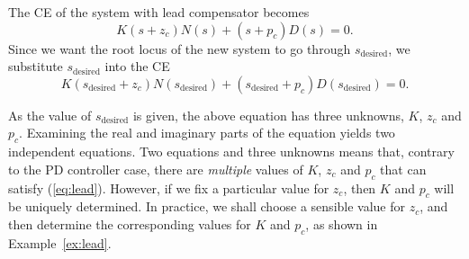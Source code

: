 \documentclass[a4paper,11pt]{report}
\theoremstyle{definition}
\newcommand{\des}{\textrm{desired}}
\begin{document}
The CE of the system with lead compensator becomes
\[
K(s+z_c)N(s) + (s+p_c)D(s)=0.
\]
Since we want the root locus of the new system to go through $s_\des$,
we substitute $s_\des$ into the CE
\begin{equation}
  \label{eq:lead}
  K(s_\des+z_c)N(s_\des)+(s_\des+p_c)D(s_\des) = 0.  
\end{equation}

As the value of $s_\des$ is given, the above equation has three
unknowns, $K$, $z_c$ and $p_c$. Examining the real and imaginary parts
of the equation yields two independent equations. Two equations and
three unknowns means that, contrary to the PD controller case, there
are \emph{multiple} values of $K$, $z_c$ and $p_c$ that can satisfy
(\ref{eq:lead}). However, if we fix a particular value for $z_c$, then
$K$ and $p_c$ will be uniquely determined. In practice, we shall
choose a sensible value for $z_c$, and then determine the
corresponding values for $K$ and $p_c$, as shown in
Example~\ref{ex:lead}.
\end{document}
